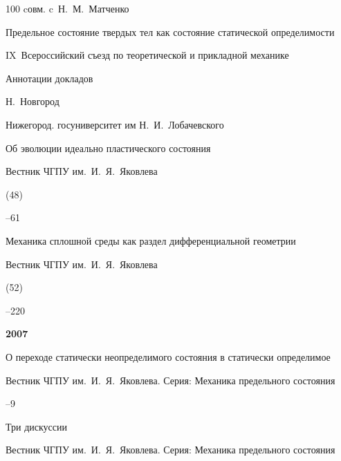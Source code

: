 \begin{thebibliography}{100}
\miscnote cовм. c~Н.~М.~Матченко




\paper Предельное состояние твердых тел как состояние статической определимости 

\inbook IX~Всероссийский съезд по теоретической и прикладной механике

\bookinfo Аннотации докладов


\publaddr Н.~Новгород

\publ Нижегород. госуниверситет им Н.~И.~Лобачевского






\paper Об эволюции идеально пластического состояния 

\jour Вестник ЧГПУ им.~И.~Я.~Яковлева


(48)

–61






\paper Механика сплошной среды как раздел дифференциальной геометрии 

\jour Вестник \mbox{ЧГПУ} им.~И.~Я.~Яковлева


(52)

–220



\item[] \centerline{\bf 2007}




\paper О переходе статически неопределимого состояния в статически определимое 

\jour Вестник ЧГПУ им.~И.~Я.~Яковлева. Серия: Механика предельного состояния



–9






\paper Три дискуссии 

\jour Вестник ЧГПУ им.~И.~Я.~Яковлева. Серия: Механика предельного состояния


\end{thebibliography}
